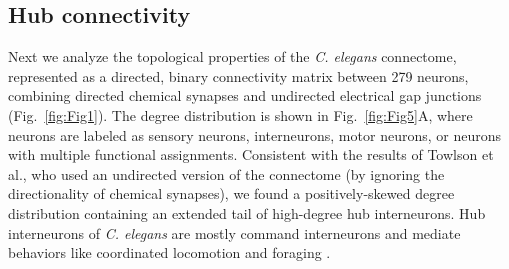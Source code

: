 \documentclass[10pt,letterpaper]{article}
\begin{document}


\subsection*{Hub connectivity}


Next we analyze the topological properties of the \emph{C. elegans} connectome, represented as a directed, binary connectivity matrix between 279 neurons, combining directed chemical synapses and undirected electrical gap junctions (Fig.~\ref{fig:Fig1}).
The degree distribution is shown in Fig.~\ref{fig:Fig5}A, where neurons are labeled as sensory neurons, interneurons, motor neurons, or neurons with multiple functional assignments.
Consistent with the results of Towlson et al., who used an undirected version of the connectome (by ignoring the directionality of chemical synapses), we found a positively-skewed degree distribution containing an extended tail of high-degree hub interneurons.
Hub interneurons of \emph{C. elegans} are mostly command interneurons and mediate behaviors like coordinated locomotion and foraging \cite{tsalik2003}.
\end{document}
